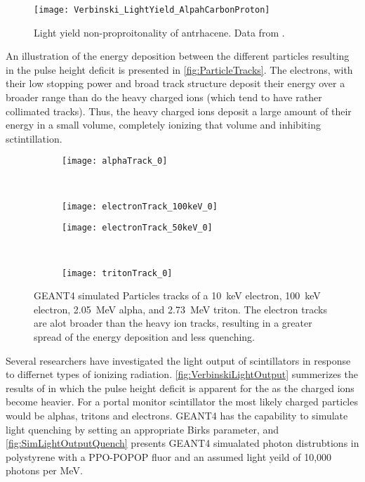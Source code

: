 \begin{figure}
  \centering
  \texttt{[image: Verbinski\_LightYield\_AlpahCarbonProton]}
  \caption[Light yield non-proporitonality of anthracene]{Light yield non-proproitonality of antrhacene. Data from \cite{Verbinski_1968}.}
  \label{fig:lightYieldVerbinski}
\end{figure}
An illustration of the energy deposition between the different particles resulting in the pulse height deficit is presented in \autoref{fig:ParticleTracks}.
The electrons, with their low stopping power and broad track structure deposit their energy over a broader range than do the heavy charged ions (which tend to have rather collimated tracks).
Thus, the heavy charged ions deposit a large amount of their energy in a small volume, completely ionizing that volume and inhibiting sctintillation.
\begin{figure}
  \begin{subfigure}[b]{0.45\textwidth}
  \texttt{[image: alphaTrack\_0]}
  \end{subfigure}%
  ~
  \begin{subfigure}[b]{0.45\textwidth}
  \texttt{[image: electronTrack\_100keV\_0]}
  \end{subfigure}
  
  \begin{subfigure}[b]{0.45\textwidth}
  \texttt{[image: electronTrack\_50keV\_0]}
  \end{subfigure}%
  ~
  \begin{subfigure}[b]{0.45\textwidth}
  \texttt{[image: tritonTrack\_0]}
  \end{subfigure}
  \caption[Particle Tracks of Alpha, Triton and Electrons]{GEANT4 simulated Particles tracks of a \SI{10}{\keV} electron, \SI{100}{\keV} electron, \SI{2.05}{\MeV} alpha, and \SI{2.73}{\MeV} triton.  The electron tracks are alot broader than the heavy ion tracks, resulting in a greater spread of the energy deposition and less quenching.}
  \label{fig:ParticleTracks}
\end{figure}
Several researchers have investigated the light output of scintillators in response to differnet types of ionizing radiation.
\autoref{fig:VerbinskiLightOutput} summerizes the results of \cite{Verbinski_1968} in which the pulse height deficit is apparent for the as the charged ions become heavier.
For a portal monitor scintillator the most likely charged particles would be alphas, tritons and electrons.
GEANT4 has the capability to simulate light quenching by setting an appropriate Birks parameter, and \autoref{fig:SimLightOutputQuench} presents GEANT4 simualated photon distrubtions in polystyrene with a PPO-POPOP fluor and an assumed light yeild of 10,000 photons per MeV.
